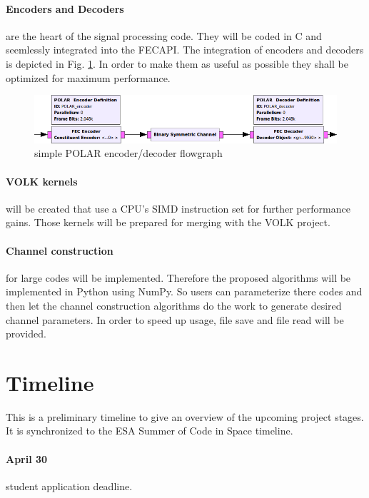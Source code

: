 \documentclass[a4paper,12pt]{scrartcl}
\def\CC{{C\nolinebreak[4]\hspace{-.05em}\raisebox{.4ex}{\tiny\textbf{++}}}}
\begin{document}
\paragraph{Encoders and Decoders} are the heart of the signal processing code.
They will be coded in \CC{} and seemlessly integrated into the FECAPI.
The integration of encoders and decoders is depicted in Fig. \ref{fig:polar_mockup}.
In order to make them as useful as possible they shall be optimized for maximum performance.

\begin{figure}[tbh]
 \includegraphics[width=\textwidth]{figure/POLAR_mockup.png}
 \caption{simple POLAR encoder/decoder flowgraph}
 \label{fig:polar_mockup}
\end{figure}

\paragraph{\acs{VOLK} kernels} will be created that use a \ac{CPU}'s \ac{SIMD} instruction set for further performance gains.
Those kernels will be prepared for merging with the \ac{VOLK} project.

\paragraph{Channel construction} for large codes will be implemented.
Therefore the proposed algorithms \cite{tal2013construct} will be implemented in Python using NumPy.
So users can parameterize there codes and then let the channel construction algorithms do the work to generate desired channel parameters.
In order to speed up usage, file save and file read will be provided.


\section{Timeline}
This is a preliminary timeline to give an overview of the upcoming project stages.
It is synchronized to the \ac{ESA} Summer of Code in Space timeline.

\paragraph{April 30} student application deadline.
\end{document}
